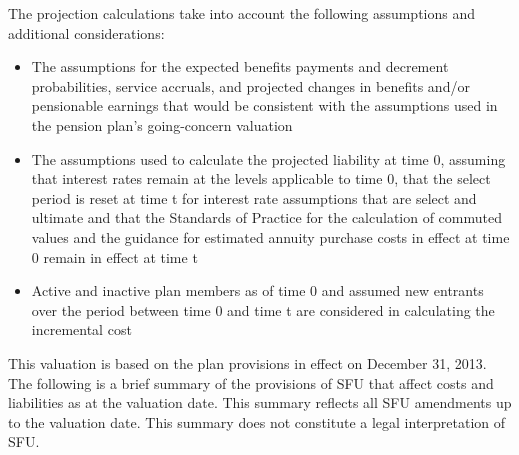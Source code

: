 \documentclass{report}
\begin{document}
\vspace{3mm}
The projection calculations take into account the following assumptions and additional considerations:
\begin{itemize}
\item The assumptions for the expected benefits payments and decrement probabilities, service accruals, and projected changes in benefits and/or pensionable earnings that would be consistent with the assumptions used in the pension plan's going-concern valuation
\item The assumptions used to calculate the projected liability at time 0, assuming that interest rates remain at the levels applicable to time 0, that the select period is reset at time t for interest rate assumptions that are select and ultimate and that the Standards of Practice for the calculation of commuted values and the guidance for estimated annuity purchase costs in effect at time 0 remain in effect at time t
\item Active and inactive plan members as of time 0 and assumed new entrants over the period between time 0 and time t are considered in calculating the incremental cost
\end{itemize}


This valuation is based on the plan provisions in effect on December 31, 2013. The following is a brief summary of the provisions of SFU that affect costs and liabilities as at the valuation date. This summary reflects all SFU amendments up to the valuation date. This summary does not constitute a legal interpretation of SFU.
\end{document}
